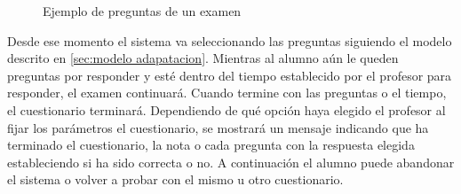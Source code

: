 \begin{figure}[!htp]
	\hfill
	\caption{Ejemplo de preguntas de un examen}
	\label{fig:e-valUAM examenes}
\end{figure}

Desde ese momento el sistema va seleccionando las preguntas siguiendo el modelo descrito en \ref{sec:modelo adapatacion}. Mientras al alumno aún le queden preguntas por responder y esté dentro del tiempo establecido por el profesor para responder, el examen continuará. Cuando termine con las preguntas o el tiempo, el cuestionario terminará. Dependiendo de qué opción haya elegido el profesor al fijar los parámetros el cuestionario, se mostrará un mensaje indicando que ha terminado el cuestionario, la nota o cada pregunta con la respuesta elegida estableciendo si ha sido correcta o no. A continuación el alumno puede abandonar el sistema o volver a probar con el mismo u otro cuestionario.


